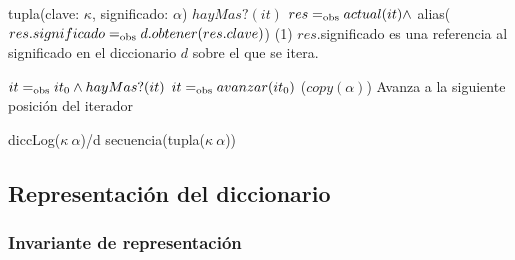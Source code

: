 {   }
{tupla(clave: $\kappa$, significado: $\alpha$)}
{$hayMas?(it)$}
{$res =_{\mathrm{obs}} actual(it) \land$ alias($res.significado =_{\mathrm{obs}} d.obtener(res.clave)$)}
{\bigo(1)}
{$res$.significado es una referencia al significado en el
    diccionario $d$ sobre el que se itera.}
{}

{   }
{}
{$it =_{\mathrm{obs}} it_0 \land hayMas?(it)$}
{$it =_{\mathrm{obs}} avanzar(it_0)$}
{\bigo($copy(\alpha)$)}
{}
{Avanza a la siguiente posición del iterador}



{diccLog($\kappa\ \alpha$)/d}
{secuencia(tupla($\kappa\ \alpha$))}
{}


\subsection{Representación del diccionario}



\subsubsection{Invariante de representación}

